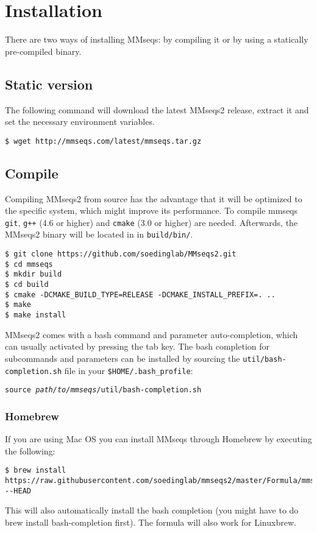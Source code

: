 \documentclass[11pt,a4paper]{scrreprt}
\begin{document}
\clearpage


\section{Installation}

There are two ways of installing MMseqs: by compiling it or by using a statically pre-compiled binary. 
\subsection{Static version}
The following command will download the latest MMseqs2 release, extract it and set the necessary environment variables.

\begin{verbatim}
$ wget http://mmseqs.com/latest/mmseqs.tar.gz
\end{verbatim}
\subsection{Compile}
Compiling MMseqs2 from source has the advantage that it will be optimized to the specific system, which might improve its performance. To compile mmseqs \texttt{git}, \texttt{g++} (4.6 or higher) and \texttt{cmake} (3.0 or higher) are needed. Afterwards, the MMseqs2 binary will be located in in \texttt{build/bin/}.

\begin{verbatim}
$ git clone https://github.com/soedinglab/MMseqs2.git
$ cd mmseqs
$ mkdir build
$ cd build
$ cmake -DCMAKE_BUILD_TYPE=RELEASE -DCMAKE_INSTALL_PREFIX=. ..
$ make 
$ make install 
\end{verbatim}

MMseqs2 comes with a bash command and parameter auto-completion, which can usually activated by pressing the tab key. The bash completion for subcommands and parameters can be installed by sourcing the \texttt{util/bash-completion.sh} file in your \texttt{\$HOME/.bash\_profile}:
\begin{flushleft}
\texttt{source \textit{path/to/mmseqs}/util/bash-completion.sh}
\end{flushleft}

\subsubsection{Homebrew}
If you are using Mac OS you can install MMseqs through Homebrew by executing the following:
\begin{Verbatim}[fontsize=\footnotesize]
$ brew install https://raw.githubusercontent.com/soedinglab/mmseqs2/master/Formula/mmseqs.rb --HEAD
\end{Verbatim}
This will also automatically install the bash completion (you might have to do brew install bash-completion first). The formula will also work for Linuxbrew.
\end{document}
